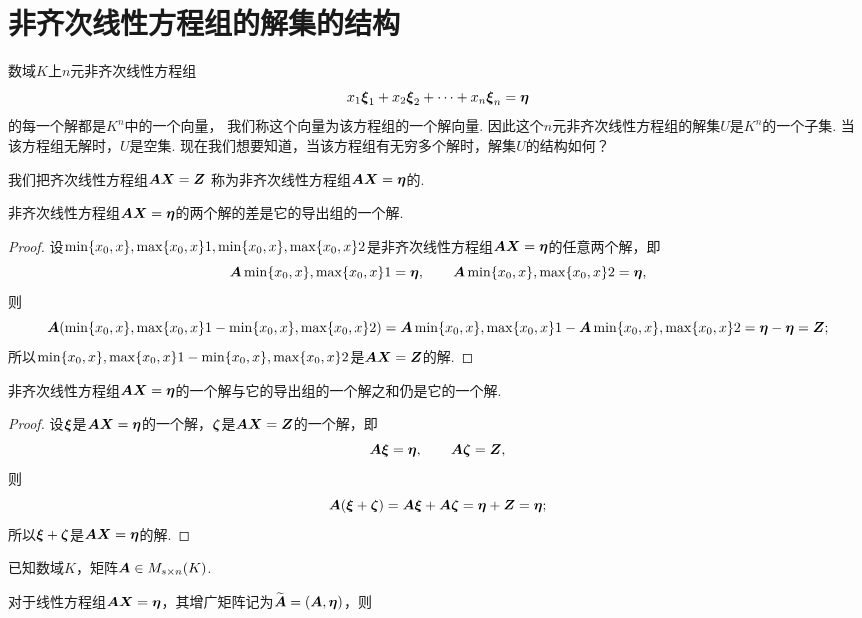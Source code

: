 \section{非齐次线性方程组的解集的结构}
数域\(K\)上\(n\)元非齐次线性方程组\[
	x_1\a_1+x_2\a_2+\dotsb+x_n\a_n=\b
\]的每一个解都是\(K^n\)中的一个向量，
我们称这个向量为该方程组的一个解向量.
因此这个\(n\)元非齐次线性方程组的解集\(U\)是\(K^n\)的一个子集.
当该方程组无解时，\(U\)是空集.
现在我们想要知道，当该方程组有无穷多个解时，解集\(U\)的结构如何？

我们把齐次线性方程组\(\A\x=\z\)
称为非齐次线性方程组\(\A\x=\b\)的.

\begin{proposition}
非齐次线性方程组\(\A\x=\b\)的两个解的差是它的导出组的一个解.
\begin{proof}
设\(\X1,\X2\)是非齐次线性方程组\(\A\x=\b\)的任意两个解，即\[
	\A\X1=\b, \qquad
	\A\X2=\b,
\]
则\[
	\A(\X1-\X2)=\A\X1-\A\X2=\b-\b=\z;
\]
所以\(\X1-\X2\)是\(\A\x=\z\)的解.
\end{proof}
\end{proposition}

\begin{proposition}
非齐次线性方程组\(\A\x=\b\)的一个解与它的导出组的一个解之和仍是它的一个解.
\begin{proof}
\def\ma{\mat{\xi}}
\def\mb{\mat{\zeta}}
设\(\ma\)是\(\A\x=\b\)的一个解，\(\mb\)是\(\A\x=\z\)的一个解，即\[
	\A\ma=\b, \qquad
	\A\mb=\z,
\]
则\[
	\A(\ma+\mb)=\A\ma+\A\mb=\b+\z=\b;
\]
所以\(\ma+\mb\)是\(\A\x=\b\)的解.
\end{proof}
\end{proposition}

\begin{theorem}\label{theorem:线性方程组.非齐次线性方程组有解的条件及解的结构}
已知数域\(K\)，矩阵\(\A \in M_{s \times n}(K)\).

对于线性方程组\(\A\x=\b\)，其增广矩阵记为\(\wA = (\A,\b)\)，则
\end{theorem}

